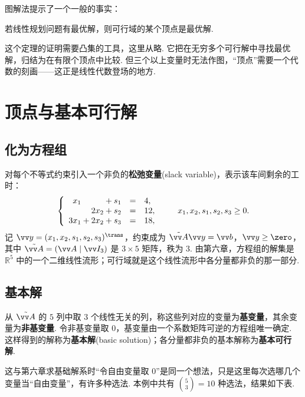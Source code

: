 图解法提示了一个一般的事实：

\begin{theorem}\label{thm:or-vertex}
	若线性规划问题有最优解，则可行域的某个顶点是最优解.
\end{theorem}

这个定理的证明需要凸集的工具，这里从略. 它把在无穷多个可行解中寻找最优解，归结为在有限个顶点中比较. 但三个以上变量时无法作图，“顶点”需要一个代数的刻画——这正是线性代数登场的地方.

\section{顶点与基本可行解}\label{app:or-basic}

\subsection{化为方程组}

对每个不等式约束引入一个非负的\textbf{松弛变量}(slack variable)，表示该车间剩余的工时：
\[
\left\{\begin{array}{rcl}
	x_1\hphantom{{}+2x_2}+s_1&=&4,\\
	2x_2+s_2&=&12,\\
	3x_1+2x_2+s_3&=&18,
\end{array}\right.
\qquad x_1,x_2,s_1,s_2,s_3\ge0.
\]
记 $\vv y=(x_1,x_2,s_1,s_2,s_3)^\trans$，约束成为 $\tilde{\vv A}\vv y=\vv b$，$\vv y\ge\zero$，其中 $\tilde{\vv A}=(\vv A\mid\vv I_3)$ 是 $3\times5$ 矩阵，秩为 $3$. 由第六章，方程组的解集是 $\mathbb{R}^5$ 中的一个二维线性流形；可行域就是这个线性流形中各分量都非负的那一部分.

\subsection{基本解}

从 $\tilde{\vv A}$ 的 $5$ 列中取 $3$ 个线性无关的列，称这些列对应的变量为\textbf{基变量}，其余变量为\textbf{非基变量}. 令非基变量取 $0$，基变量由一个系数矩阵可逆的方程组唯一确定. 这样得到的解称为\textbf{基本解}(basic solution)；各分量都非负的基本解称为\textbf{基本可行解}.

这与第六章求基础解系时“令自由变量取 $0$”是同一个想法，只是这里每次选哪几个变量当“自由变量”，有许多种选法. 本例中共有 $\binom53=10$ 种选法，结果如下表.


